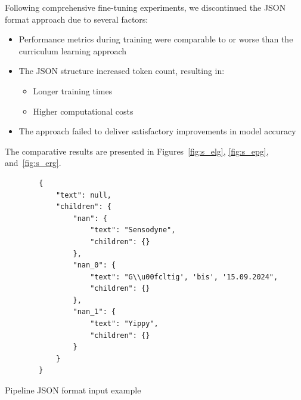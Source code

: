 \documentclass[licencjacka,en]{pracamgr}
\begin{document}
\begin{appendices}
Following comprehensive fine-tuning experiments, we discontinued the JSON format approach due to several factors:

\begin{itemize}
    \item Performance metrics during training were comparable to or worse than the curriculum learning approach
    \item The JSON structure increased token count, resulting in:
    \begin{itemize}
        \item Longer training times
        \item Higher computational costs
    \end{itemize}
    \item The approach failed to deliver satisfactory improvements in model accuracy
\end{itemize}

The comparative results are presented in Figures~\ref{fig:s_elg}, \ref{fig:s_epg}, and~\ref{fig:s_erg}.
\begin{center}
   \begin{listing}
        \begin{verbatim}
        {
            "text": null,
            "children": {
                "nan": {
                    "text": "Sensodyne",
                    "children": {}
                },
                "nan_0": {
                    "text": "G\\u00fcltig', 'bis', '15.09.2024",
                    "children": {}
                },
                "nan_1": {
                    "text": "Yippy",
                    "children": {}
                }
            }
        }
        \end{verbatim}
        \caption{Pipeline JSON format input example} 
        \label{list:sel-json}
    \end{listing}
\end{center}


\end{appendices}
\end{document}

